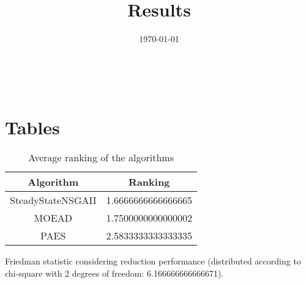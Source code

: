 \documentclass{article}
\title{Results}
\author{}
\date{\today}
\begin{document}
\oddsidemargin 0in \topmargin 0in\maketitle
\
\section{Tables}
\begin{table}[!htp]
\centering
\caption{Average ranking of the algorithms}
\begin{tabular}{c|c}
Algorithm&Ranking\\
\hline
SteadyStateNSGAII&1.6666666666666665\\
MOEAD&1.7500000000000002\\
PAES&2.5833333333333335\\
\end{tabular}
\end{table}


Friedman statistic considering reduction performance (distributed according to chi-square with 2 degrees of freedom: 6.166666666666671).
\end{document}
